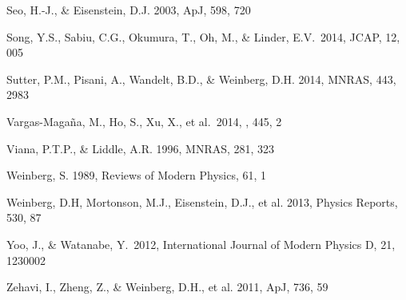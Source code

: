 \documentclass[iop]{emulateapj}
\begin{document}
\begin{thebibliography}{}


Seo, H.-J., \& Eisenstein, D.J. 2003, ApJ, 598, 720



Song, Y.S., Sabiu, C.G., 
Okumura, T., Oh, M., \& Linder, E.V.\ 2014, JCAP, 12, 005 

Sutter, P.M., Pisani, A., Wandelt, B.D., \& Weinberg, D.H. 2014, MNRAS, 443, 2983




 Vargas-Maga{\~n}a, M., Ho, S., Xu, X., et al.\ 2014, \mnras, 445, 2 

Viana, P.T.P., \& Liddle, A.R. 1996, MNRAS, 281, 323



Weinberg, S. 1989, Reviews of Modern Physics, 61, 1

Weinberg, D.H, Mortonson, M.J., Eisenstein, D.J., et al. 2013, Physics Reports, 530, 87



 Yoo, J., \& Watanabe, Y.\ 2012, International Journal of Modern Physics D, 21, 1230002 


Zehavi, I., Zheng, Z., \& Weinberg, D.H., et al. 2011, ApJ, 736, 59




\end{thebibliography}
\end{document}
